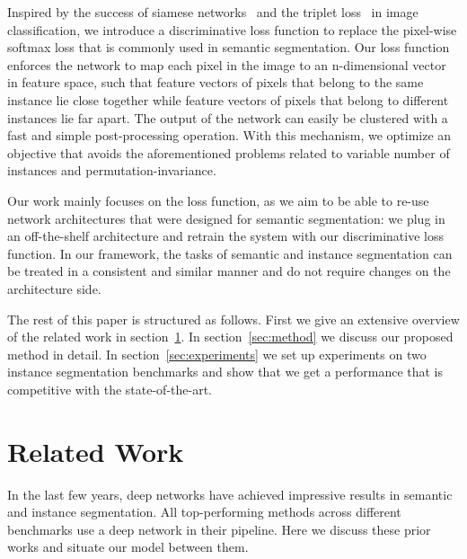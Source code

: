 \documentclass[10pt,twocolumn,letterpaper]{article}
\begin{document}
Inspired by the success of siamese networks~\cite{bromley1993signature, chopra2005learning} and the triplet loss~\cite{weinberger2009distance, schroff2015facenet} in image classification, we introduce a discriminative loss function to replace the pixel-wise softmax loss that is commonly used in semantic segmentation. Our loss function enforces the network to map each pixel in the image to an n-dimensional vector in feature space, such that feature vectors of pixels that belong to the same instance lie close together while feature vectors of pixels that belong to different instances lie far apart. The output of the network can easily be clustered with a fast and simple post-processing operation. With this mechanism, we optimize an objective that avoids the aforementioned problems related to variable number of instances and permutation-invariance.

Our work mainly focuses on the loss function, as we aim to be able to re-use network architectures that were designed for semantic segmentation: we plug in an off-the-shelf architecture 
and retrain the system with our discriminative loss function. 
In our framework, the tasks of semantic and instance segmentation can be treated in a consistent and similar manner and do not require changes on the architecture side. 

The rest of this paper is structured as follows. First we give an extensive overview of the related work in section~\ref{sec:relatedwork}. In section~\ref{sec:method} we discuss our proposed method in detail. In section~\ref{sec:experiments} we set up experiments on two instance segmentation benchmarks and show that we get a performance that is competitive with the state-of-the-art. 
\section{Related Work}
\label{sec:relatedwork}
In the last few years, deep networks have achieved impressive results in semantic and instance segmentation. All top-performing methods across different benchmarks use a deep network in their pipeline. 
Here we discuss these prior works and situate our model between them. 
\end{document}
